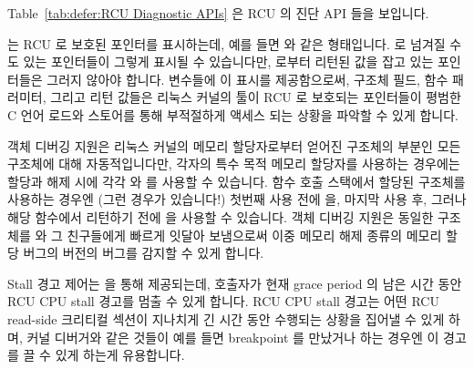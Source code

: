Table~\ref{tab:defer:RCU Diagnostic APIs}
은 RCU 의 진단 API 들을 보입니다.

 는 RCU 로 보호된 포인터를 표시하는데, 예를 들면  와 같은 형태입니다.
 로 넘겨질 수도 있는 포인터들이 그렇게 표시될 수
있습니다만,  로부터 리턴된 값을 잡고 있는 포인터들은
그러지 않아야 합니다.
변수들에 이 표시를 제공함으로써, 구조체 필드, 함수 패러미터, 그리고 리턴 값들은
리눅스 커널의  툴이 RCU 로 보호되는 포인터들이 평범한 C 언어 로드와
스토어를 통해 부적절하게 액세스 되는 상황을 파악할 수 있게 합니다.

객체 디버깅 지원은 리눅스 커널의 메모리 할당자로부터 얻어진 구조체의 부분인
모든  구조체에 대해 자동적입니다만, 각자의 특수 목적 메모리
할당자를 사용하는 경우에는 할당과 해제 시에 각각  와
 를 사용할 수 있습니다.
함수 호출 스택에서 할당된  구조체를 사용하는 경우엔 (그런 경우가
있습니다!) 첫번째 사용 전에  을, 마지막 사용 후,
그러나 해당 함수에서 리턴하기 전에  을 사용할
수 있습니다.
객체 디버깅 지원은 동일한  구조체를  와 그
친구들에게 빠르게 잇달아 보냄으로써 이중 메모리 해제 종류의 메모리 할당 버그의
 버전의 버그를 감지할 수 있게 합니다.

Stall 경고 제어는  을 통해 제공되는데, 호출자가 현재
grace period 의 남은 시간 동안 RCU CPU stall 경고를 멈출 수 있게 합니다.
RCU CPU stall 경고는 어떤 RCU read-side 크리티컬 섹션이 지나치게 긴 시간 동안
수행되는 상황을 집어낼 수 있게 하며, 커널 디버거와 같은 것들이 예를 들면
breakpoint 를 만났거나 하는 경우엔 이 경고를 끌 수 있게 하는게 유용합니다.

\iffalse

